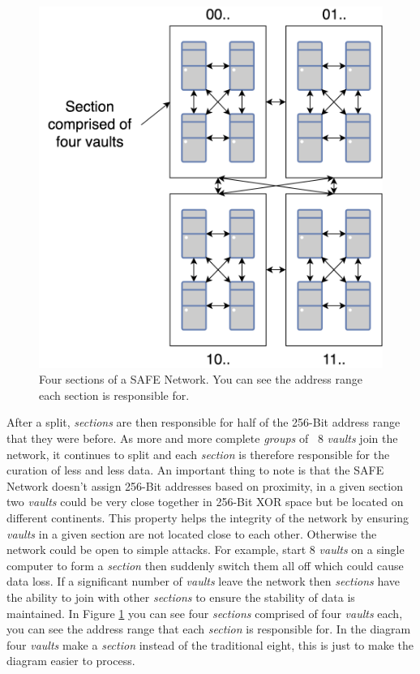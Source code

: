\begin{figure}
	\begin{center}
		\includegraphics[scale=0.3]{diagrams/safe-network-sections}
		\caption{Four sections of a SAFE Network. You can see the address range each section is responsible for.}
		\label{fig:safe-sections}
	\end{center}
\end{figure}

After a split, \textit{sections} are then responsible for half of the 256-Bit address range that they were before. As more and more complete \textit{groups} of ~8 \textit{vaults} join the network, it continues to split and each \textit{section} is therefore responsible for the curation of less and less data. An important thing to note is that the SAFE Network doesn't assign 256-Bit addresses based on proximity, in a given section two \textit{vaults} could be very close together in 256-Bit XOR space but be located on different continents. This property helps the integrity of the network by ensuring \textit{vaults} in a given section are not located close to each other. Otherwise the network could be open to simple attacks. For example, start 8 \textit{vaults} on a single computer to form a \textit{section} then suddenly switch them all off which could cause data loss. If a significant number of \textit{vaults} leave the network then \textit{sections} have the ability to join with other \textit{sections} to ensure the stability of data is maintained. In Figure \ref{fig:safe-sections} you can see four \textit{sections} comprised of four \textit{vaults} each, you can see the address range that each \textit{section} is responsible for. In the diagram four \textit{vaults} make a \textit{section} instead of the traditional eight, this is just to make the diagram easier to process.

